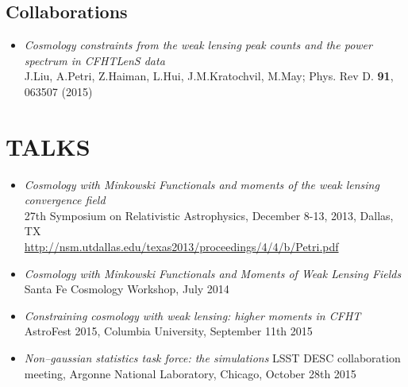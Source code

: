 \documentclass[margin, 10pt]{res} %
\begin{document}
\begin{resume}
\subsection{Collaborations}

\begin{itemize}
\item {\sl Cosmology constraints from the weak lensing peak counts and the power spectrum in CFHTLenS data} \\ 
J.Liu, A.Petri, Z.Haiman, L.Hui, J.M.Kratochvil, M.May; Phys. Rev D. \textbf{91}, 063507 (2015)
\end{itemize}

\section{TALKS}
\begin{itemize}
\item{\sl Cosmology with Minkowski Functionals and moments of the weak lensing convergence field}\\
27th Symposium on Relativistic Astrophysics, December 8-13, 2013, Dallas, TX \\
\url{http://nsm.utdallas.edu/texas2013/proceedings/4/4/b/Petri.pdf}

\item {\sl Cosmology with Minkowski Functionals and Moments of Weak Lensing Fields}\\
Santa Fe Cosmology Workshop, July 2014

\item {\sl Constraining cosmology with weak lensing: higher moments in CFHT}\\
AstroFest 2015, Columbia University, September 11th 2015

\item {\sl  Non--gaussian statistics task force: the simulations}
LSST DESC collaboration meeting, Argonne National Laboratory, Chicago, October 28th 2015



\end{itemize}


\end{resume}
\end{document}

